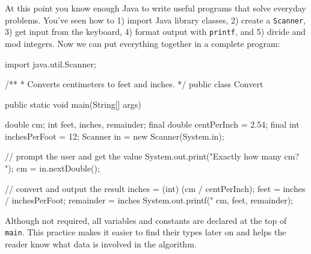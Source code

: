 \documentclass[12pt]{book}
\theoremstyle{exercise}
\newcommand{\java}[1]{\verb"#1"}
\begin{document}


At this point you know enough Java to write useful programs that solve everyday problems.
You've seen how to 1) import Java library classes, 2) create a \java{Scanner}, 3) get input from the keyboard, 4) format output with \java{printf}, and 5) divide and mod integers.
Now we can put everything together in a complete program:


\begin{code}
import java.util.Scanner;

/**
 * Converts centimeters to feet and inches.
 */
public class Convert {

    public static void main(String[] args) {
        double cm;
        int feet, inches, remainder;
        final double centPerInch = 2.54;
        final int inchesPerFoot = 12;
        Scanner in = new Scanner(System.in);

        // prompt the user and get the value
        System.out.print("Exactly how many cm? ");
        cm = in.nextDouble();

        // convert and output the result
        inches = (int) (cm / centPerInch);
        feet = inches / inchesPerFoot;
        remainder = inches %
        System.out.printf("%
                          cm, feet, remainder);
    }
}
\end{code}


Although not required, all variables and constants are declared at the top of \java{main}.
This practice makes it easier to find their types later on and helps the reader know what data is involved in the algorithm.
\end{document}
